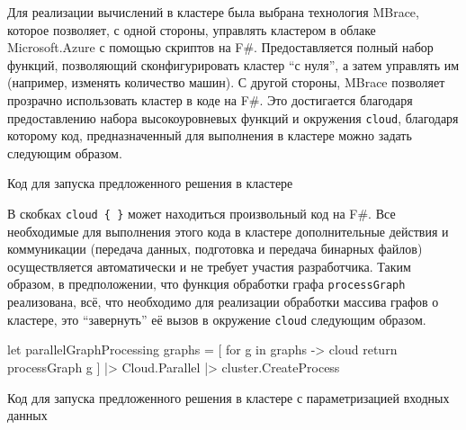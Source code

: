 Для реализации вычислений в кластере была выбрана технология MBrace, которое позволяет, с одной стороны, управлять кластером в облаке Microsoft.Azure с помощью скриптов на F\#. Предоставляется полный набор функций, позволяющий сконфигурировать кластер ``с нуля'', а затем управлять им (например, изменять количество машин). С другой стороны, MBrace позволяет прозрачно использовать кластер в коде на F\#. Это достигается благодаря предоставлению набора высокоуровневых функций и окружения \texttt{cloud}, благодаря которому код, предназначенный для выполнения в кластере можно задать следующим образом.

\begin{listing}
\caption{Код для запуска предложенного решения в кластере}
\label{lst:mbraceExample}
\end{listing}

В скобках \verb|cloud { }| может находиться произвольный код на F\#. Все необходимые для выполнения этого кода в кластере дополнительные действия и коммуникации (передача данных, подготовка и передача бинарных файлов) осуществляется автоматически и не требует участия разработчика. Таким образом, в предположении, что функция обработки графа \texttt{processGraph}  реализована, всё, что необходимо для реализации обработки массива графов о кластере, это ``завернуть'' её вызов в окружение \texttt{cloud} следующим образом.

\begin{listing}
    \begin{pyglist}[language=ocaml,numbers=left,numbersep=5pt]
    
let parallelGraphProcessing graphs = 
    [ for g in graphs -> cloud { return processGraph g } ]
    |> Cloud.Parallel
    |> cluster.CreateProcess

\end{pyglist}
\caption{Код для запуска предложенного решения в кластере с параметризацией входных данных}
\label{lst:mbraceExample}
\end{listing}
